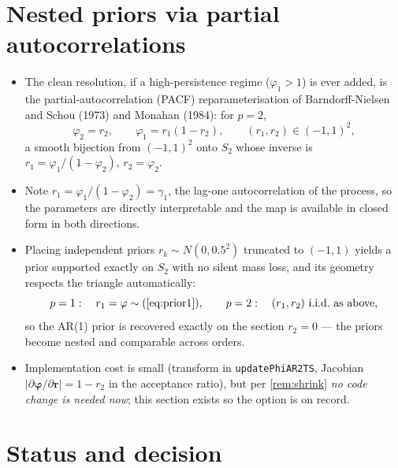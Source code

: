 \documentclass[11pt]{article}
\newcommand{\eref}[1]{(\ref{#1})}
\newcommand{\bphi}{\boldsymbol{\varphi}}
\theoremstyle{plain}
\theoremstyle{definition}
\theoremstyle{remark}
\begin{document}
\section{Nested priors via partial autocorrelations}\label{sec:pacf}

\begin{itemize}
  \item The clean resolution, if a high-persistence regime
        ($\varphi_1 > 1$) is ever added, is the partial-autocorrelation
        (PACF) reparameterisation of Barndorff-Nielsen and Schou (1973) and
        Monahan (1984): for $p = 2$,
        \begin{equation}\label{eq:pacf}
          \varphi_2 = r_2,
          \qquad
          \varphi_1 = r_1 (1 - r_2),
          \qquad
          (r_1, r_2) \in (-1, 1)^2,
        \end{equation}
        a smooth bijection from $(-1, 1)^2$ onto $S_2$ whose inverse is
        $r_1 = \varphi_1 / (1 - \varphi_2)$, $r_2 = \varphi_2$.
  \item Note $r_1 = \varphi_1 / (1 - \varphi_2) = \gamma_1$, the lag-one
        autocorrelation of the process, so the parameters are directly
        interpretable and the map is available in closed form in both
        directions.
  \item Placing independent priors $r_k \sim N(0, 0.5^2)$ truncated to
        $(-1, 1)$ yields a prior supported exactly on $S_2$ with no silent
        mass loss, and its geometry respects the triangle automatically:
        \begin{equation}\label{eq:nested}
          p = 1: \quad r_1 = \varphi \sim \eref{eq:prior1},
          \qquad
          p = 2: \quad (r_1, r_2) \ \text{i.i.d.\ as above},
        \end{equation}
        so the AR(1) prior is recovered exactly on the section $r_2 = 0$ ---
        the priors become nested and comparable across orders.
  \item Implementation cost is small (transform in
        \texttt{updatePhiAR2TS}, Jacobian
        $|\partial \bphi / \partial \mathbf{r}| = 1 - r_2$ in the acceptance
        ratio), but per \cref{rem:shrink} \emph{no code change is needed
        now}; this section exists so the option is on record.
\end{itemize}

\section{Status and decision}\label{sec:status}
\end{document}
